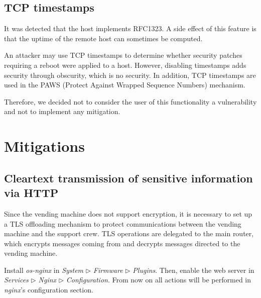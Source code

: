 \documentclass[draft]{homework}
\begin{document}
    \subsection{TCP timestamps}
    \begin{displayquote}
        It was detected that the host implements RFC1323.
        \textelp{}
        A side effect of this feature is that the uptime of the remote host can sometimes be computed.
    \end{displayquote}
    
    An attacker may use TCP timestamps to determine whether security patches requiring a reboot were applied to a host.
    However, disabling timestamps adds security through obscurity, which is no security. 
    In addition, TCP timestamps are used in the PAWS (Protect Against Wrapped Sequence Numbers) mechanism.
    
    Therefore, we decided not to consider the user of this functionality a vulnerability and not to implement any mitigation.
    
    
    \section{Mitigations}
    \subsection{Cleartext transmission of sensitive information via HTTP}\label{sec:http-mitigation}
    Since the vending machine does not support encryption, it is necessary to set up a TLS offloading mechanism to protect communications between the vending machine and the support crew.
    TLS operations are delegated to the main router, which encrypts messages coming from and decrypts messages directed to the vending machine. 
    
    Install \textit{os-nginx} in \textit{System} $\triangleright$ \textit{Firmware} $\triangleright$ \textit{Plugins}.
    Then, enable the web server in \textit{Services} $\triangleright$ \textit{Nginx} $\triangleright$ \textit{Configuration}.
    From now on all actions will be performed in \textit{nginx}'s configuration section.
    
\end{document}
